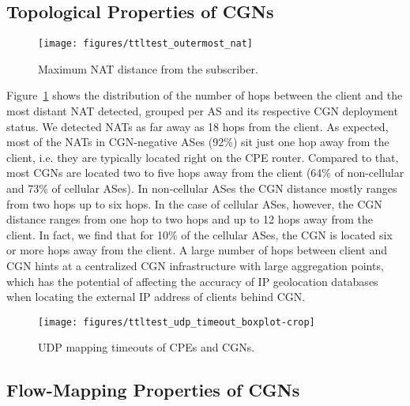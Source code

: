 \documentclass[10pt]{sig-alternate-05-2015}
\begin{document}
{\subsection{Topological Properties of CGNs}
\label{sec:cgnlocation}



\begin{figure}
  \begin{center}
    \texttt{[image: figures/ttltest\_outermost\_nat]}
  \caption{Maximum NAT distance from the subscriber.}
    \label{fig:natdistance}
    \vspace{-1em}
  \end{center}
\end{figure}

Figure~\ref{fig:natdistance} shows the distribution of the number of hops 
between the client and the most distant NAT detected, grouped per AS and its 
respective CGN deployment status. We detected NATs as far away as 
18{} hops from the client. As expected, most of the NATs 
in CGN-negative ASes (92\%{}) 
sit just one hop away from the client, i.e. they are typically located right on 
the CPE router. Compared to that, most CGNs are located two to five hops 
away from the client (64\%{} of 
non-cellular and 73\%{} of cellular 
ASes). In non-cellular ASes the CGN distance mostly ranges from two hops up 
to six hops. In the case of cellular ASes, however, the CGN distance ranges 
from one hop to two hops and up to 12 hops away from the client. In fact, we 
find that for 10\%{} of the cellular ASes, 
the CGN is located six or more hops away from the client. A large number of 
hops between client and CGN hints at a centralized CGN infrastructure with 
large aggregation points, which has the potential of affecting the accuracy of 
IP geolocation databases when locating the external IP address of 
clients behind CGN.



\begin{figure}
  \begin{center}
    \texttt{[image: figures/ttltest\_udp\_timeout\_boxplot-crop]}
  \caption{UDP mapping timeouts of CPEs and CGNs.}
  \vspace{-1em}
    \label{fig:nattimeout}
  \end{center}
\end{figure}

\subsection{Flow-Mapping Properties of CGNs}
\label{sec:flowmappingprops}

}
\end{document}

